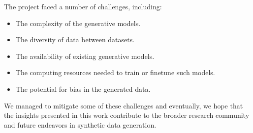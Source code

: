 The project faced a number of challenges, including:

\begin{itemize}
    \item The complexity of the generative models.
    \item The diversity of data between datasets.
    \item The availability of existing generative models.
    \item The computing resources needed to train or finetune such models.
    \item The potential for bias in the generated data.
\end{itemize}

We managed to mitigate some of these challenges and eventually, we hope that the insights presented in this work contribute to the broader research community and future endeavors in synthetic data generation.
